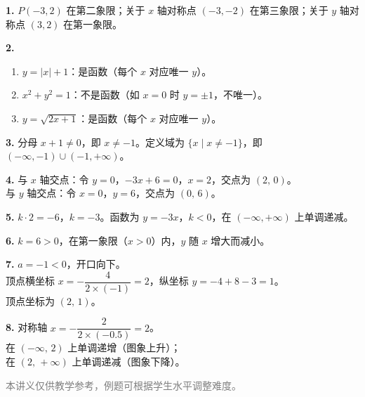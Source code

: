 \documentclass[12pt, a4paper]{ctexart}
\begin{document}
\begin{knowledgebox}[参考答案]
\textbf{1.} $P(-3,2)$ 在第二象限；关于 $x$ 轴对称点 $(-3,-2)$ 在第三象限；关于 $y$ 轴对称点 $(3,2)$ 在第一象限。

\textbf{2.}
\begin{enumerate}[label=(\alph*)]
  \item $y=|x|+1$：是函数（每个 $x$ 对应唯一 $y$）。
  \item $x^2+y^2=1$：不是函数（如 $x=0$ 时 $y=\pm1$，不唯一）。
  \item $y=\sqrt{2x+1}$：是函数（每个 $x$ 对应唯一 $y$）。
\end{enumerate}

\textbf{3.} 分母 $x+1 \neq 0$，即 $x \neq -1$。定义域为 $\{x \mid x \neq -1\}$，即 $(-\infty,-1)\cup(-1,+\infty)$。

\textbf{4.} 与 $x$ 轴交点：令 $y=0$，$-3x+6=0$，$x=2$，交点为 $(2,\,0)$。\\
与 $y$ 轴交点：令 $x=0$，$y=6$，交点为 $(0,\,6)$。

\textbf{5.} $k \cdot 2 = -6$，$k = -3$。函数为 $y = -3x$，$k<0$，在 $(-\infty,+\infty)$ 上单调递减。

\textbf{6.} $k=6>0$，在第一象限（$x>0$）内，$y$ 随 $x$ 增大而减小。

\textbf{7.} $a = -1 < 0$，开口向下。\\
顶点横坐标 $x = -\dfrac{4}{2 \times (-1)} = 2$，纵坐标 $y = -4 + 8 - 3 = 1$。\\
顶点坐标为 $(2,\,1)$。

\textbf{8.} 对称轴 $x = -\dfrac{2}{2\times(-0.5)} = 2$。\\
在 $(-\infty,\,2)$ 上单调递增（图象上升）；\\
在 $(2,\,+\infty)$ 上单调递减（图象下降）。
\end{knowledgebox}

\vfill
\begin{center}
\small\textcolor{gray}{本讲义仅供教学参考，例题可根据学生水平调整难度。}
\end{center}
\end{document}
